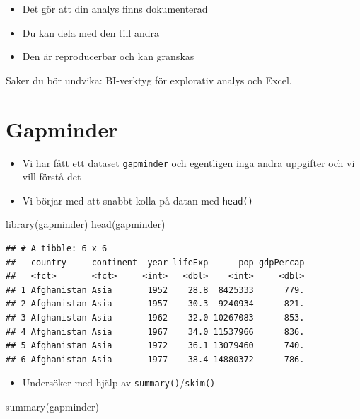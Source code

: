 \documentclass[
]{book}
\newenvironment{Shaded}{\begin{snugshade}}{\end{snugshade}}
\newcommand{\FunctionTok}[1]{\textcolor[rgb]{0.00,0.00,0.00}{#1}}
\newcommand{\NormalTok}[1]{#1}
\providecommand{\tightlist}{%
  \setlength{\itemsep}{0pt}\setlength{\parskip}{0pt}}
\begin{document}
\begin{itemize}
\item
  Det gör att din analys finns dokumenterad
\item
  Du kan dela med den till andra
\item
  Den är reproducerbar och kan granskas
\end{itemize}

Saker du bör undvika: BI-verktyg för explorativ analys och Excel.

\hypertarget{gapminder}{%
\section{Gapminder}\label{gapminder}}

\begin{itemize}
\item
  Vi har fått ett dataset \texttt{gapminder} och egentligen inga andra uppgifter och vi vill förstå det
\item
  Vi börjar med att snabbt kolla på datan med \texttt{head()}
\end{itemize}

\begin{Shaded}
\begin{Highlighting}[]
\FunctionTok{library}\NormalTok{(gapminder)}
\FunctionTok{head}\NormalTok{(gapminder)}
\end{Highlighting}
\end{Shaded}

\begin{verbatim}
## # A tibble: 6 x 6
##   country     continent  year lifeExp      pop gdpPercap
##   <fct>       <fct>     <int>   <dbl>    <int>     <dbl>
## 1 Afghanistan Asia       1952    28.8  8425333      779.
## 2 Afghanistan Asia       1957    30.3  9240934      821.
## 3 Afghanistan Asia       1962    32.0 10267083      853.
## 4 Afghanistan Asia       1967    34.0 11537966      836.
## 5 Afghanistan Asia       1972    36.1 13079460      740.
## 6 Afghanistan Asia       1977    38.4 14880372      786.
\end{verbatim}

\begin{itemize}
\tightlist
\item
  Undersöker med hjälp av \texttt{summary()}/\texttt{skim()}
\end{itemize}

\begin{Shaded}
\begin{Highlighting}[]
\FunctionTok{summary}\NormalTok{(gapminder)}
\end{Highlighting}
\end{Shaded}
\end{document}
